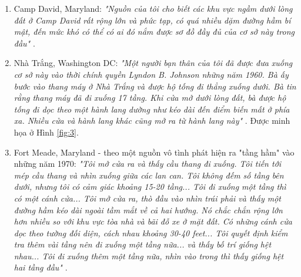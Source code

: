 \documentclass[10pt,twocolumn,letterpaper]{article}
\begin{document}
\begin{flushleft}
\begin{enumerate}
    \item Camp David, Maryland: \textit{"Nguồn của tôi cho biết các khu vực ngầm dưới lòng đất ở Camp David rất rộng lớn và phức tạp, có quá nhiều dặm đường hầm bí mật, đến mức khó có thể có ai đó nắm được sơ đồ đầy đủ của cơ sở này trong đầu"} \cite{22}.
    \item Nhà Trắng, Washington DC: \textit{"Một người bạn thân của tôi đã được đưa xuống cơ sở này vào thời chính quyền Lyndon B. Johnson những năm 1960. Bà ấy bước vào thang máy ở Nhà Trắng và được hộ tống đi thẳng xuống dưới. Bà tin rằng thang máy đã đi xuống 17 tầng. Khi cửa mở dưới lòng đất, bà được hộ tống đi dọc theo một hành lang dường như kéo dài đến điểm biến mất ở phía xa. Nhiều cửa và hành lang khác cũng mở ra từ hành lang này"} \cite{22}. Được minh họa ở Hình \ref{fig:3}.
    \item Fort Meade, Maryland - theo một nguồn vô tình phát hiện ra "tầng hầm" vào những năm 1970: \textit{"Tôi mở cửa ra và thấy cầu thang đi xuống. Tôi tiến tới mép cầu thang và nhìn xuống giữa các lan can. Tôi không đếm số tầng bên dưới, nhưng tôi có cảm giác khoảng 15-20 tầng... Tôi đi xuống một tầng thì có một cánh cửa... Tôi mở cửa ra, thò đầu vào nhìn trái phải và thấy một đường hầm kéo dài ngoài tầm mắt về cả hai hướng. Nó chắc chắn rộng lớn hơn nhiều so với khu vực tòa nhà và bãi đỗ xe ở mặt đất. Có những cánh cửa dọc theo tường đối diện, cách nhau khoảng 30-40 feet... Tôi quyết định kiểm tra thêm vài tầng nên đi xuống một tầng nữa... và thấy bố trí giống hệt nhau... Tôi đi xuống thêm một tầng nữa, nhìn vào trong thì thấy giống hệt hai tầng đầu"} \cite{22}.
\end{enumerate}
\end{flushleft}
\end{document}
